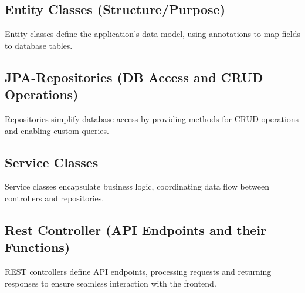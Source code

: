     \subsection{Entity Classes (Structure/Purpose)}
    Entity classes define the application's data model, using annotations to map fields to database tables.

    \subsection{JPA-Repositories (DB Access and CRUD Operations)}
    Repositories simplify database access by providing methods for CRUD operations and enabling custom queries.

    \subsection{Service Classes}
    Service classes encapsulate business logic, coordinating data flow between controllers and repositories.

    \subsection{Rest Controller (API Endpoints and their Functions)}
    REST controllers define API endpoints, processing requests and returning responses to ensure seamless interaction with the frontend.
